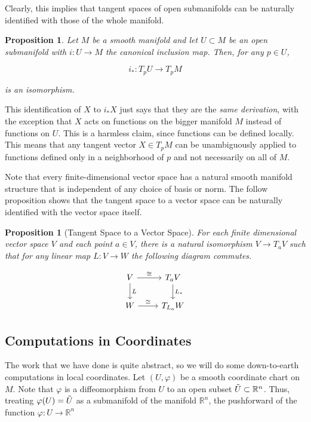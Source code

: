 \documentclass{article}
\newtheorem{proposition}[theorem]{Proposition}
\theoremstyle{remark}
\theoremstyle{definition}
\begin{document}
    Clearly, this implies that tangent spaces of open submanifolds can be naturally identified with those of the whole manifold. 

    \begin{proposition}
      Let $M$ be a smooth manifold and let $U \subset M$ be an open submanifold with $i: U \longrightarrow M$ the canonical inclusion map. Then, for any $p \in U$, 

        \[i_* : T_p U \longrightarrow T_p M\]

      is an isomorphism. 
    \end{proposition}

    This identification of $X$ to $i_* X$ just says that they are the \textit{same derivation}, with the exception that $X$ acts on functions on the bigger manifold $M$ instead of functions on $U$. This is a harmless claim, since functions can be defined locally. This means that any tangent vector $X \in T_p M$ can be unambiguously applied to functions defined only in a neighborhood of $p$ and not necessarily on all of $M$. 

    Note that every finite-dimensional vector space has a natural smooth manifold structure that is independent of any choice of basis or norm. The follow proposition shows that the tangent space to a vector space can be naturally identified with the vector space itself. 

    \begin{proposition}[Tangent Space to a Vector Space]
      For each finite dimensional vector space $V$ and each point $a \in V$, there is a natural isomorphism $V \rightarrow T_a V$ such that for any linear map $L: V \longrightarrow W$ the following diagram commutes. 

      \[\begin{tikzcd}
        V \arrow{r}{\cong} \arrow{d}{L}& T_aV \arrow{d}{L_*} \\
        W \arrow{r}{\cong} & T_{L_a}W 
      \end{tikzcd}\]
    \end{proposition}

  \subsection{Computations in Coordinates}

    The work that we have done is quite abstract, so we will do some down-to-earth computations in local coordinates. Let $(U, \varphi)$ be a smooth coordinate chart on $M$. Note that $\varphi$ is a diffeomorphism from $U$ to an open subset $\Tilde{U} \subset \mathbb{R}^n$. Thus, treating $\varphi(U) = \Tilde{U}$ as a submanifold of the manifold $\mathbb{R}^n$, the pushforward of the function $\varphi: U \longrightarrow \mathbb{R}^n$
\end{document}
